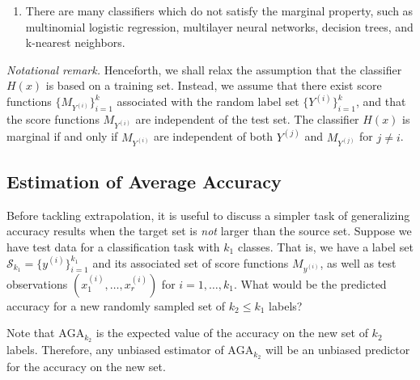 \documentclass[twoside,11pt]{article}
\begin{document}
\begin{enumerate}

\item There are many classifiers which do not satisfy the marginal
  property, such as multinomial logistic regression, multilayer neural
  networks, decision trees, and k-nearest neighbors.
\end{enumerate}

\emph{Notational remark.}  Henceforth, we shall relax the assumption
that the classifier $H(x)$ is based on a training set.  Instead, we
assume that there exist score functions $\{M_{Y^{(i)}}\}_{i=1}^k$
associated with the random label set $\{Y^{(i)}\}_{i=1}^k$, and that
the score functions $M_{Y^{(i)}}$ are independent of the test set.
The classifier $H(x)$ is marginal if and only if $M_{Y^{(i)}}$ are
independent of both $Y^{(j)}$ and $M_{Y^{(j)}}$ for $j \neq i$.

\subsection{Estimation of Average Accuracy}\label{sec:estimation_average_accuracy}

Before tackling extrapolation, it is useful to discuss a simpler task of generalizing accuracy results when the target set is \emph{not} larger than the source set. Suppose we have test data for a classification task with $k_1$
classes.  That is, we have a label set $\mathcal{S}_{k_1} =
\{y^{(i)}\}_{i=1}^{k_1}$ and its associated set of score functions
$M_{y^{(i)}}$, as well as test observations $(x_1^{(i)},\hdots,
x_{r}^{(i)})$ for $i = 1,\hdots, k_1$.  What would be the predicted
accuracy for a new randomly sampled set of $k_2 \leq k_1$ labels?

Note that $\text{AGA}_{k_2}$ is the expected value of the accuracy on
the new set of $k_2$ labels.  Therefore, any unbiased estimator of
$\text{AGA}_{k_2}$ will be an unbiased predictor for the accuracy on
the new set.
\end{document}
